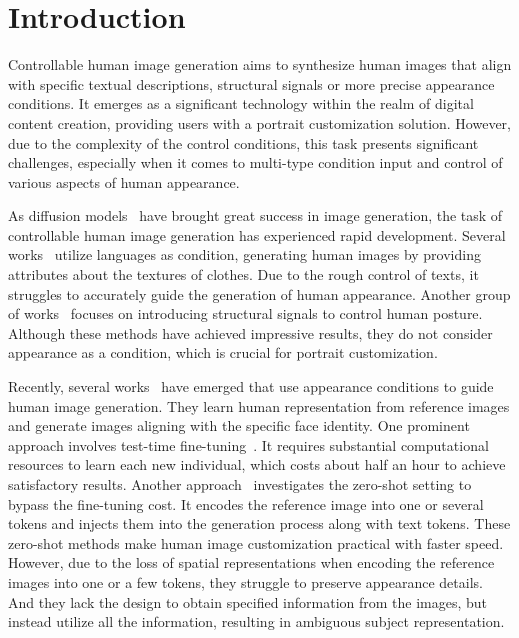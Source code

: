 \section{Introduction}

Controllable human image generation aims to synthesize human images that align with specific textual descriptions, structural signals or more precise appearance conditions. It emerges as a significant technology within the realm of digital content creation, providing users with a portrait customization solution. However, due to the complexity of the control conditions, this task presents significant challenges, especially when it comes to multi-type condition input and control of various aspects of human appearance.

As diffusion models~\cite{ho2020ddpm,rombach2022ldm,ramesh2022dalle2,saharia2022imagen,nichol2022glide,dhariwal2021diffusionbeatgans} have brought great success in image generation, the task of controllable human image generation has experienced rapid development. Several works~\cite{jiang2022text2human} utilize languages as condition, generating human images by providing attributes about the textures of clothes. Due to the rough control of texts, it struggles to accurately guide the generation of human appearance. Another group of works~\cite{zhang2023controlnet, mou2023t2iadapter, zhao2024unicontrolnet, liu2023hyperhuman} focuses on introducing structural signals to control human posture. Although these methods have achieved impressive results, they do not consider appearance as a condition, which is crucial for portrait customization.

Recently, several works~\cite{ruiz2023dreambooth, hu2021lora, gal2022textualinversion, kumari2023customdiffusion, liu2023cones, shi2023instantbooth, ye2023ipadapter, chen2023anydoor, li2023photomaker, wang2024instantid, zhang2024ssrencoder} have emerged that use appearance conditions to guide human image generation. They learn human representation from reference images and generate images aligning with the specific face identity. One prominent approach involves test-time fine-tuning~\cite{ruiz2023dreambooth, hu2021lora, gal2022textualinversion, kumari2023customdiffusion, liu2023cones}. It requires substantial computational resources to learn each new individual, which costs about half an hour to achieve satisfactory results. Another approach~\cite{shi2023instantbooth, ye2023ipadapter, chen2023anydoor, li2023photomaker, wang2024instantid, zhang2024ssrencoder} investigates the zero-shot setting to bypass the fine-tuning cost. It encodes the reference image into one or several tokens and injects them into the generation process along with text tokens. These zero-shot methods make human image customization practical with faster speed. However, due to the loss of spatial representations when encoding the reference images into one or a few tokens, they struggle to preserve appearance details. And they lack the design to obtain specified information from the images, but instead utilize all the information, resulting in ambiguous subject representation.

